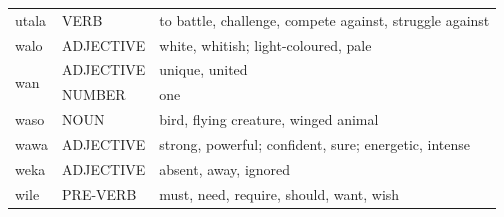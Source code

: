 \documentclass[14pt, a4paper]{extreport}
\begin{document}
\begin{longtable}{llp{10cm}}
  utala & VERB & to battle, challenge, compete against, struggle against \\
  walo & ADJECTIVE & white, whitish; light-coloured, pale \\
  \multirow[t]{2}{*}{wan} & ADJECTIVE & unique, united \\
  & NUMBER & one \\
  waso & NOUN & bird, flying creature, winged animal \\
  wawa & ADJECTIVE & strong, powerful; confident, sure; energetic, intense \\
  weka & ADJECTIVE & absent, away, ignored \\
  wile & PRE-VERB & must, need, require, should, want, wish \\
\end{longtable}
\end{document}
